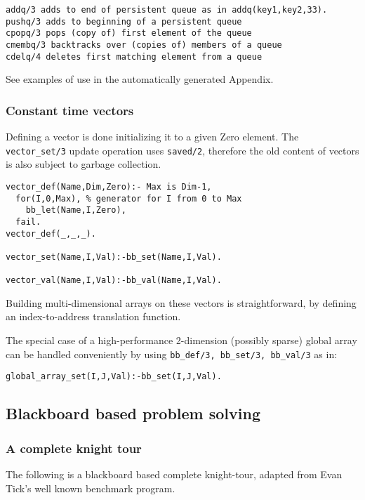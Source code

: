 \documentclass{article}
\begin{document}
\begin{verbatim}
addq/3 adds to end of persistent queue as in addq(key1,key2,33).
pushq/3 adds to beginning of a persistent queue
cpopq/3 pops (copy of) first element of the queue
cmembq/3 backtracks over (copies of) members of a queue
cdelq/4 deletes first matching element from a queue
\end{verbatim}

See examples of use in the automatically generated Appendix.

\subsubsection{Constant time vectors}

Defining a vector is done initializing it to a given Zero
element. The {\tt vector\_set/3} update operation uses {\tt saved/2}, therefore
the old content of vectors is also subject to garbage collection. 

\begin{verbatim}
vector_def(Name,Dim,Zero):- Max is Dim-1,
  for(I,0,Max), % generator for I from 0 to Max
    bb_let(Name,I,Zero),
  fail.
vector_def(_,_,_).

vector_set(Name,I,Val):-bb_set(Name,I,Val).

vector_val(Name,I,Val):-bb_val(Name,I,Val).
\end{verbatim}

Building multi-dimensional arrays on these vectors is straightforward, by
defining an index-to-address translation function.

The special case of a high-performance 2-dimension (possibly sparse) global array can be handled conveniently by using {\tt bb\_def/3, bb\_set/3, bb\_val/3} as in:

\begin{verbatim}
global_array_set(I,J,Val):-bb_set(I,J,Val).
\end{verbatim}

\subsection{Blackboard based problem solving}

\subsubsection{A complete knight tour}

The following is a blackboard based complete knight-tour, adapted from
Evan Tick's well known benchmark program.
\end{document}
